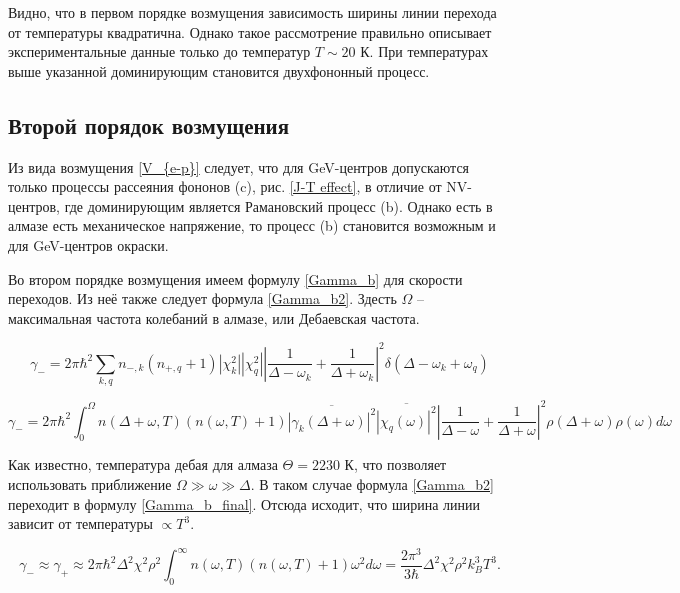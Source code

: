 Видно, что в первом порядке возмущения зависимость ширины линии перехода от температуры
квадратична. Однако такое рассмотрение правильно описывает экспериментальные данные
только до температур $T \sim 20 \text{ К}$. При температурах выше указанной доминирующим
становится двухфононный процесс.

\subsection{Второй порядок возмущения}
Из вида возмущения \ref{V_{e-p}} следует, что для GeV-центров допускаются только
процессы рассеяния фононов (c), рис. \ref{J-T effect}, в отличие от NV-центров, где
доминирующим является Рамановский процесс (b). Однако есть в алмазе есть механическое
напряжение, то процесс (b) становится возможным и для GeV-центров окраски. 

Во втором порядке возмущения имеем формулу \ref{Gamma_b} для скорости переходов.
Из неё также следует формула \ref{Gamma_b2}. Здесть $\Omega$ -- максимальная
частота колебаний в алмазе, или Дебаевская частота.

\begin{equation}
    \label{Gamma_b}
    \gamma_{-} = 2\pi \hbar^2 \sum_{k, q}n_{-, k}\left(n_{+, q} + 1 \right) 
    |\chi_k^2||\chi_q^2|\left|\frac{1}{\Delta - \omega_k} + \frac{1}{\Delta + \omega_k
    } \right|^2 \delta\left(\Delta - \omega_k + \omega_q \right)
\end{equation}

\begin{equation}
    \label{Gamma_b2}
    \gamma_{-} = 2 \pi \hbar^2 \int_{0}^{\Omega} n\left(\Delta + \omega, T\right)
    \left(n\left(\omega, T \right) + 1\right) \overline{\left|\gamma_k \left(
        \Delta + \omega
    \right)\right|^2}\overline{\left|\chi_q\left(\omega\right)\right|^2}\left|
    \frac{1}{\Delta - \omega} + \frac{1}{\Delta + \omega}\right|^2\rho\left(\Delta + \omega
    \right)\rho\left(\omega\right)d\omega
\end{equation}


Как известно, температура дебая для алмаза $\Theta = 2230 \text{ К}$, что позволяет
использовать приближение $\Omega \gg \omega \gg \Delta$. В таком случае формула
\ref{Gamma_b2} переходит в формулу \ref{Gamma_b_final}. Отсюда исходит, что ширина
линии зависит от температуры $\propto T^3$. 

\begin{equation}
    \label{Gamma_b_final}
    \gamma_{-} \approx \gamma_{+} \approx 2 \pi \hbar^2 \Delta^2 \chi^2 \rho^2
    \int_{0}^{\infty} n\left(\omega, T\right)\left(n\left(\omega, T\right)+1\right)
    \omega^2 d\omega = \frac{2 \pi^3}{3\hbar}\Delta^2 \chi^2 \rho^2 k_{B}^3 T^3.
\end{equation}




